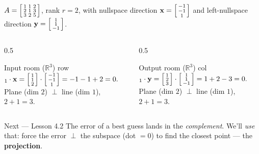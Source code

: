 \documentclass[aspectratio=169, 11pt]{beamer}
\newcommand{\xx}{\mathbf{x}}
\newcommand{\yy}{\mathbf{y}}
\begin{document}
\begin{frame}[t, plain]
  $A=\begin{bsmallmatrix} 1 & 1 & 2\\ 2 & 1 & 3\\ 3 & 2 & 5 \end{bsmallmatrix}$, rank $r=2$, with
  nullspace direction $\xx=\begin{bsmallmatrix} -1\\-1\\1 \end{bsmallmatrix}$ and left-nullspace
  direction $\yy=\begin{bsmallmatrix} 1\\1\\-1 \end{bsmallmatrix}$.
  \begin{columns}[T]
    \begin{column}{0.5\textwidth}
      \begin{block}{Input room ($\mathbb{R}^3$)}
        row$_1\cdot\xx=\begin{bsmallmatrix} 1\\1\\2 \end{bsmallmatrix}\cdot\begin{bsmallmatrix} -1\\-1\\1 \end{bsmallmatrix}=-1-1+2=0.$\\[4pt]
        Plane (dim $2$) $\perp$ line (dim $1$), $2+1=3$.
      \end{block}
    \end{column}
    \begin{column}{0.5\textwidth}
      \begin{block}{Output room ($\mathbb{R}^3$)}
        col$_1\cdot\yy=\begin{bsmallmatrix} 1\\2\\3 \end{bsmallmatrix}\cdot\begin{bsmallmatrix} 1\\1\\-1 \end{bsmallmatrix}=1+2-3=0.$\\[4pt]
        Plane (dim $2$) $\perp$ line (dim $1$), $2+1=3$.
      \end{block}
    \end{column}
  \end{columns}
  \vspace{4pt}
  \begin{block}{Next --- Lesson 4.2}
    The error of a best guess lands in the \emph{complement}. We'll \emph{use} that: force the error
    $\perp$ the subspace (dot $=0$) to find the closest point --- the \textbf{projection}.
  \end{block}
\end{frame}
\end{document}
